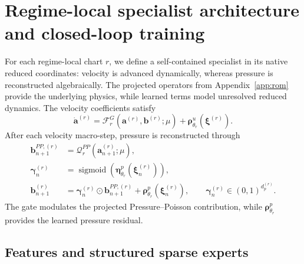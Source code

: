 
\section{Regime-local specialist architecture and closed-loop training}
\label{app:specialists}

For each regime-local chart $r$, we define a self-contained 
specialist in its native reduced coordinates: velocity is advanced
dynamically, whereas pressure is reconstructed algebraically.
The projected operators from Appendix~\ref{app:rom} provide the underlying physics, while learned terms model unresolved reduced dynamics. The velocity coefficients satisfy
\begin{equation}
  \dot{\bm a}^{(r)}
  =
  \mathcal F_r^G
  \left(
    \bm a^{(r)},\bm b^{(r)};\mu
  \right)
  +
  \bm\rho^u_{\theta_r}
  \left(
    \bm\xi^{(r)}
  \right).
  \label{eq:app_hybrid_velocity_rhs}
\end{equation}
After each velocity macro-step, pressure is reconstructed through
\begin{align}
  \bm b_{n+1}^{PP,(r)}
  &=
  \mathcal Q_r^{PP}
  \left(
    \bm a_{n+1}^{(r)};\mu
  \right),
  \nonumber\\
  \bm\gamma_n^{(r)}
  &=
  \operatorname{sigmoid}
  \left(
    \bm\eta^p_{\theta_r}
    (\bm\xi_n^{(r)})
  \right),
  \nonumber\\
  \bm b_{n+1}^{(r)}
  &=
  \bm\gamma_n^{(r)}
  \odot
  \bm b_{n+1}^{PP,(r)}
  +
  \bm\rho^p_{\theta_r}
  (\bm\xi_n^{(r)}),
  \qquad
  \bm\gamma_n^{(r)}
  \in(0,1)^{d_p^{(r)}}.
  \label{eq:app_pressure_closure}
\end{align}
The gate modulates the projected Pressure--Poisson contribution, while
$\bm\rho^p_{\theta_r}$ provides the learned pressure residual.


\subsection{Features and structured sparse experts}


